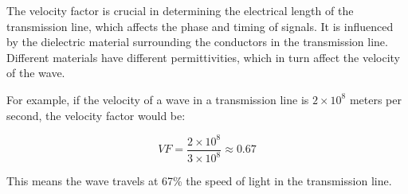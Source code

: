 The velocity factor is crucial in determining the electrical length of the transmission line, which affects the phase and timing of signals. It is influenced by the dielectric material surrounding the conductors in the transmission line. Different materials have different permittivities, which in turn affect the velocity of the wave.

For example, if the velocity of a wave in a transmission line is \( 2 \times 10^8 \) meters per second, the velocity factor would be:

\[
VF = \frac{2 \times 10^8}{3 \times 10^8} \approx 0.67
\]

This means the wave travels at 67\% the speed of light in the transmission line.

